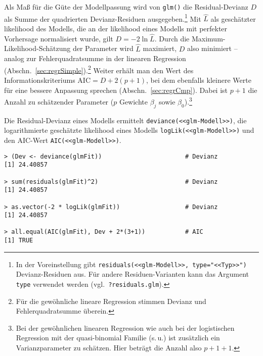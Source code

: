 Als Maß für die Güte der Modellpassung wird von \lstinline!glm()! die Residual-Devianz $D$ als Summe der quadrierten Devianz-Residuen ausgegeben.\footnote{In der Voreinstellung gibt \lstinline!residuals(<<glm-Modell>>, type="<<Typ>>")! Devianz-Residuen aus. Für andere Residuen-Varianten kann das Argument \lstinline!type! verwendet werden (vgl.\ \lstinline!?residuals.glm!).} Mit $\hat{L}$ als geschätzter likelihood des Modells, die an der likelihood eines Modells mit perfekter Vorhersage normalisiert wurde, gilt $D = -2 \ln \hat{L}$. Durch die Maximum-Likelihood-Schätzung der Parameter wird $\hat{L}$ maximiert, $D$ also minimiert -- analog zur Fehlerquadratsumme in der linearen Regression (Abschn.\ \ref{sec:regrSimple}).\footnote{Für die gewöhnliche lineare Regression stimmen Devianz und Fehlerquadratsumme überein.} Weiter erhält man den Wert des Informationskriteriums $\text{AIC} = D + 2 (p+1)$, bei dem ebenfalls kleinere Werte für eine bessere Anpassung sprechen (Abschn.\ \ref{sec:regrCmp}). Dabei ist $p+1$ die Anzahl zu schätzender Parameter ($p$ Gewichte $\beta_{j}$ sowie $\beta_{0}$).\footnote{Bei der gewöhnlichen linearen Regression wie auch bei der logistischen Regression mit der quasi-binomial Familie (s.\,u.) ist zusätzlich ein Varianzparameter zu schätzen. Hier beträgt die Anzahl also $p+1+1$.}

Die Residual-Devianz eines Modells ermittelt \lstinline!deviance(<<glm-Modell>>)!, die logarithmierte geschätzte likelihood eines Modells \lstinline!logLik(<<glm-Modell>>)! und den AIC-Wert  \lstinline!AIC(<<glm-Modell>>)!.
\begin{lstlisting}
> (Dev <- deviance(glmFit))                       # Devianz
[1] 24.40857

> sum(residuals(glmFit)^2)                        # Devianz
[1] 24.40857

> as.vector(-2 * logLik(glmFit))                  # Devianz
[1] 24.40857

> all.equal(AIC(glmFit), Dev + 2*(3+1))           # AIC
[1] TRUE
\end{lstlisting}

